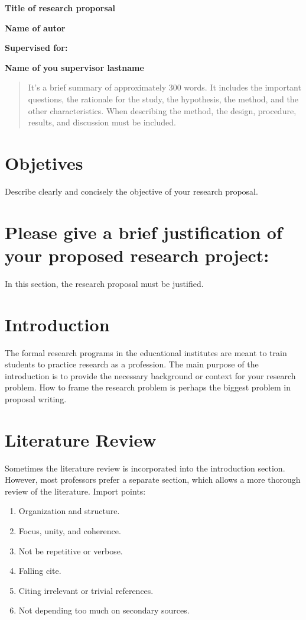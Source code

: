 \documentclass[a4paper, 12pt]{article}
\newcommand{\Tittle}[1]{ {\Huge \bfseries{ #1 }}  }
\newcommand{\subTittle}[1]{ {\Large \bfseries{ #1 }}  }
\begin{document}
\ttfamily %
\begin{center}

	\Tittle{Title of research proporsal} \par
	\subTittle{Name of autor}  \par
	\subTittle{Supervised for:} \par
	\subTittle{Name of you supervisor }\textbf{\Large lastname} \newline
\end{center}

\begin{abstract}
	It's  a brief summary of approximately 300 words. It includes the important questions, the rationale for the study, the hypothesis, the method, and the other characteristics. When describing the method, the design, procedure, results, and discussion must be included.
\end{abstract}


\section{Objetives}
Describe clearly and concisely the objective of your research proposal.
\section{Please give a brief justification of your proposed research project:}
In this section, the research proposal must be justified.
\section{Introduction}
The formal research programs in the educational institutes are meant to train students to practice
research as a profession. The main purpose of the introduction is to provide the necessary background or
context for your research problem. How to frame the research problem is perhaps 
the biggest problem in proposal writing.
\section{Literature  Review}
Sometimes the literature review is incorporated into the introduction section.
However, most professors prefer a separate section, which allows a more thorough
review of the literature.
\newline Import points:
\begin{enumerate}
	\item Organization and structure.
	\item Focus, unity, and coherence.
	\item Not be repetitive or verbose.
	\item Falling cite.
	\item Citing irrelevant or trivial references.
	\item Not depending too much on secondary sources.
\end{enumerate}
\end{document}
